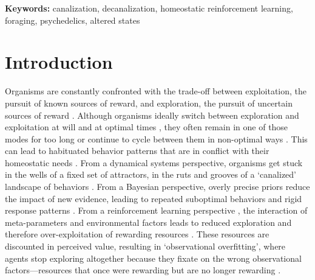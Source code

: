 \documentclass[12pt,fleqn]{article}
\begin{document}
\vspace{0.5em}
\noindent\textbf{Keywords:} canalization, decanalization, homeostatic reinforcement learning, foraging, psychedelics, altered states

\section{Introduction}

Organisms are constantly confronted with the trade-off between exploitation, the pursuit of known sources of reward, and exploration, the pursuit of uncertain sources of reward \cite{stephens_foraging_1986}. Although organisms ideally switch between exploration and exploitation at will and at optimal times \cite{pearson_decision_2014}, they often remain in one of those modes for too long or continue to cycle between them in non-optimal ways \cite{barack_neurocomputational_2016, addicott_primer_2017}. This can lead to habituated behavior patterns that are in conflict with their homeostatic needs \cite{bernard_lectures_1974}. From a dynamical systems perspective, organisms get stuck in the wells of a fixed set of attractors, in the ruts and grooves of a ‘canalized’ landscape of behaviors \cite{waddington_canalization_1959, carhart-harris_canalization_2023}. From a Bayesian perspective, overly precise priors reduce the impact of new evidence, leading to repeated suboptimal behaviors and rigid response patterns \cite{carhart-harris_rebus_2019, carhart-harris_canalization_2023}. From a reinforcement learning perspective \cite{sutton_reinforcement_1998}, the interaction of meta-parameters and environmental factors leads to reduced exploration and therefore over-exploitation of rewarding resources \cite{huys_mapping_2013}. These resources are discounted in perceived value, resulting in ‘observational overfitting’, where agents stop exploring altogether because they fixate on the wrong observational factors---resources that once were rewarding but are no longer rewarding \cite{song_observational_2019}.
\end{document}
